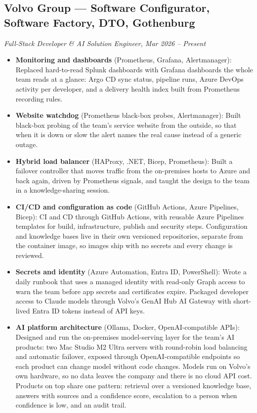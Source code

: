 \documentclass[a4paper,10pt]{article}
\begin{document}
\subsection*{Volvo Group --- Software Configurator, Software Factory, DTO, Gothenburg}
\textit{Full-Stack Developer \& AI Solution Engineer, Mar 2026 -- Present}
\begin{itemize}

  \item \textbf{Monitoring and dashboards} (Prometheus, Grafana, Alertmanager): Replaced hard-to-read Splunk dashboards with Grafana dashboards the whole team reads at a glance: Argo CD sync status, pipeline runs, Azure DevOps activity per developer, and a delivery health index built from Prometheus recording rules.

  \item \textbf{Website watchdog} (Prometheus black-box probes, Alertmanager): Built black-box probing of the team's service website from the outside, so that when it is down or slow the alert names the real cause instead of a generic outage.

  \item \textbf{Hybrid load balancer} (HAProxy, .NET, Bicep, Prometheus): Built a failover controller that moves traffic from the on-premises hosts to Azure and back again, driven by Prometheus signals, and taught the design to the team in a knowledge-sharing session.

  \item \textbf{CI/CD and configuration as code} (GitHub Actions, Azure Pipelines, Bicep): CI and CD through GitHub Actions, with reusable Azure Pipelines templates for build, infrastructure, publish and security steps. Configuration and knowledge bases live in their own versioned repositories, separate from the container image, so images ship with no secrets and every change is reviewed.

  \item \textbf{Secrets and identity} (Azure Automation, Entra ID, PowerShell): Wrote a daily runbook that uses a managed identity with read-only Graph access to warn the team before app secrets and certificates expire. Packaged developer access to Claude models through Volvo's GenAI Hub AI Gateway with short-lived Entra ID tokens instead of API keys.

  \item \textbf{AI platform architecture} (Ollama, Docker, OpenAI-compatible APIs): Designed and run the on-premises model-serving layer for the team's AI products: two Mac Studio M2 Ultra servers with round-robin load balancing and automatic failover, exposed through OpenAI-compatible endpoints so each product can change model without code changes. Models run on Volvo's own hardware, so no data leaves the company and there is no cloud API cost. Products on top share one pattern: retrieval over a versioned knowledge base, answers with sources and a confidence score, escalation to a person when confidence is low, and an audit trail.


\end{itemize}
\end{document}
